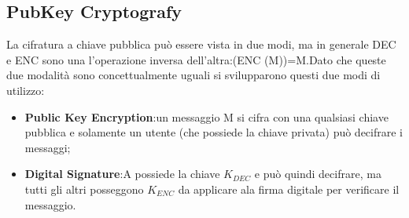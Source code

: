 \documentclass{book}
\theoremstyle{remark}
\begin{document}
\subsection{PubKey Cryptografy}
La cifratura a chiave pubblica può essere vista in due modi, ma in generale DEC e ENC sono una l'operazione inversa dell'altra:\@DEC (ENC (M))=M\@.\newline Dato che queste due modalità sono concettualmente uguali si svilupparono questi due modi di utilizzo:\begin{itemize}
	\item \textbf{Public Key Encryption}:\@Dato un messaggio M si cifra con una qualsiasi chiave pubblica e solamente un utente (che possiede la chiave privata) può decifrare i messaggi;\@
	\item \textbf{Digital Signature}:\@Solo A possiede la chiave \(K_{DEC}\) e può quindi decifrare, ma tutti gli altri posseggono \(K_{ENC}\) da applicare ala firma digitale per verificare il messaggio\@.
\end{itemize}
\end{document}
